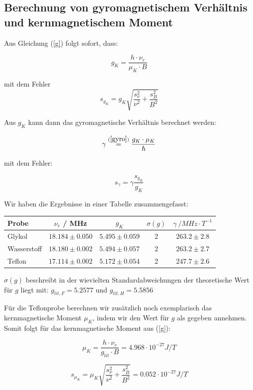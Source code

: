
\subsection{Berechnung von gyromagnetischem Verhältnis und kernmagnetischem Moment}

Aus Gleichung (\ref{g}) folgt sofort, dass:

\begin{equation} g_K = \frac{h\cdot\nu_r}{\mu_K\cdot B} \end{equation}

mit dem Fehler $$s_{g_K} = g_K\sqrt{\frac{s_\nu^2}{\nu^2}+\frac{s_B^2}{B^2}}$$

Aus $g_K$ kann dann das gyromagnetische Verhältnis berechnet werden:

$$\gamma  \stackrel{(\ref{gyro})}{=} \frac{g_K\cdot\mu_K}{\hbar}$$

mit dem Fehler:

$$s_\gamma = \gamma \frac{s_{g_K}}{g_K}$$

Wir haben die Ergebnisse in einer Tabelle zusammengefasst:

\begin{center}
\begin{tabular}{| l | c | c | c | c |} \hline
Probe & $\nu_r$ / MHz & $g_K$ & $\sigma(g)$ & $\gamma\ / MHz\cdot T^{-1}$\\ \hline
Glykol & $18.184 \pm 0.050$ & $5.495 \pm 0.059$ & 2 & $263.2 \pm 2.8$ \\
Wasserstoff &$18.180 \pm 0.002$ & $ 5.494 \pm 0.057 $ & 2 & $263.2 \pm 2.7$ \\
Teflon & $17.114 \pm 0.002$ &  $5.172 \pm 0.054$ & 2 & $247.7 \pm 2.6$\\ \hline
\end{tabular}
\end{center}

$\sigma(g)$ beschreibt in der wievielten Standardabweichungen der theoretische Wert für $g$ liegt mit: $g_{lit,F} = 5.2577$ und $g_{lit,H} = 5.5856$

Für die Teflonprobe berechnen wir zusätzlich noch exemplarisch das kernmagnetische Moment $\mu_K$, indem wir den Wert für $g$ als gegeben annehmen. Somit folgt für das kernmagnetische Moment aus (\ref{g}):

$$\mu_K =  \frac{h\cdot\nu_r}{g_{lit}\cdot B} = 4.968\cdot 10^{-27} J/T$$

$$s_{\mu_K} = \mu_K\sqrt{\frac{s_\nu^2}{\nu^2} + \frac{s_B^2}{B^2}} = 0.052\cdot 10^{-27} J/T$$


